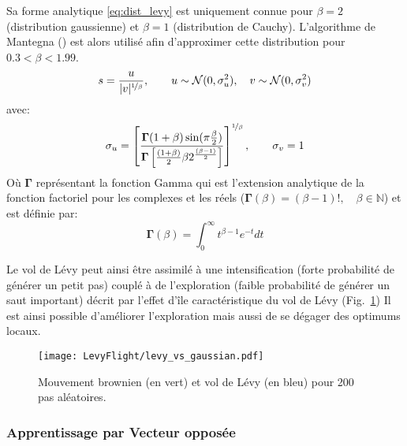 Sa forme analytique \eqref{eq:dist_levy} est uniquement connue pour $\beta = 2$ (distribution gaussienne)
et $\beta = 1$ (distribution de Cauchy).
L’algorithme de Mantegna (\cite{Mantegna19944677}) est alors utilisé afin d’approximer cette distribution
pour $0.3 < \beta < 1.99$.
\begin{equation}\label{eq:step_len}
    s = \frac{u}{\mathopen{|}v\mathclose{|}^{\nicefrac{1}{\beta}}}, \qquad u \sim \mathcal{N}(0, \sigma_{u}^{2}), \quad v \sim \mathcal{N}(0, \sigma_{v}^{2})
\end{equation}
avec:
\begin{equation}\label{eq:sigmas}
    \sigma_{u} = \left[ \frac{\mathbf{\Gamma}(1+\beta)\sin(\pi\frac{\beta}{2})}%
                             {\mathbf{\Gamma} \left[\frac{(1+\beta)}{2}\beta 2^{\frac{(\beta-1)}{2}}\right]}\right]^{\nicefrac{1}{\beta}},%
    \qquad \sigma_{v} = 1
\end{equation}
Où $\mathbf{\Gamma}$ représentant la fonction Gamma qui est l’extension analytique de la fonction factoriel pour
les complexes et les réels ($\mathbf{\Gamma}(\beta) = (\beta -1)!, \quad \beta\in \mathbb{N}$) et est définie par:
\begin{equation}
    \mathbf{\Gamma}(\beta) = \int_{0}^{\infty} t^{\beta-1}e^{-t} dt
\end{equation}

Le vol de Lévy peut ainsi être assimilé à une intensification (forte probabilité de générer un petit pas)
couplé à de l’exploration (faible probabilité de générer un saut important) décrit par
l’effet d’île caractéristique du vol de Lévy (Fig.~\ref{fig:levy_vs_gaussian})
Il est ainsi possible d’améliorer l’exploration mais aussi de se dégager des optimums locaux.

\begin{figure}
    \begin{center}
        \texttt{[image: LevyFlight/levy\_vs\_gaussian.pdf]}
    \end{center}
    \caption{Mouvement brownien (en vert) et vol de Lévy (en bleu) pour 200 pas aléatoires.
             \label{fig:levy_vs_gaussian}}
\end{figure}


\subsubsection{Apprentissage par Vecteur opposée} %
\label{ssub:apprentissage_par_vecteur_opposee}

